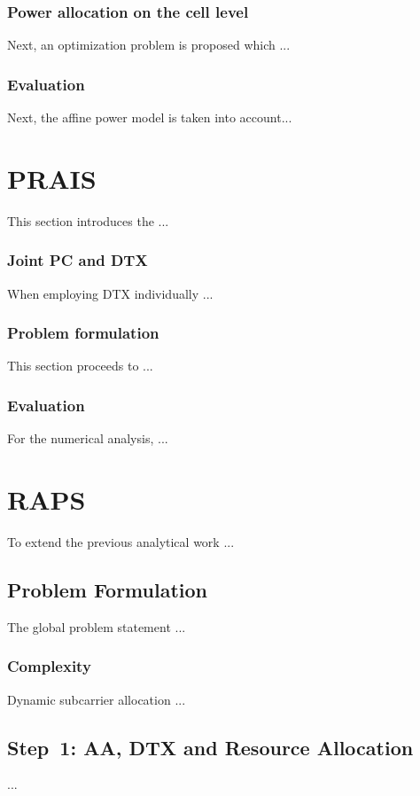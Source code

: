 \subsubsection{Power allocation on the cell level}
Next, an optimization problem is proposed which ...

\subsubsection{Evaluation}
Next, the affine power model is taken into account...

\section{\ac{PRAIS}}
\label{ch4:PRAIS}

This section introduces the ...

\subsubsection{Joint \ac{PC} and \ac{DTX}}
When employing \ac{DTX} individually ...

\subsubsection{Problem formulation}
This section proceeds to ...

\subsubsection{Evaluation}
For the numerical analysis, ...

\section{\acf{RAPS}}
\label{ch4:RAPS}
To extend the previous analytical work ...

\subsection{Problem Formulation}
The global problem statement ...

\subsubsection{Complexity}
Dynamic subcarrier allocation ...

\subsection{Step~1: \ac{AA}, \ac{DTX} and Resource Allocation}
\label{step1}
...

